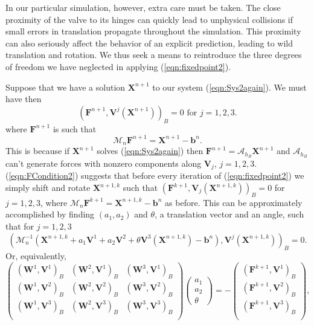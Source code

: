 \documentclass[preprint,12pt]{elsarticle}
\begin{document}
In our particular simulation, however, extra care must be taken. The close proximity of the valve to its hinges can quickly lead to unphysical collisions 
if small errors in translation propagate throughout the simulation. 
This proximity can also seriously affect the behavior of an explicit prediction, leading to wild translation and rotation. We thus seek a means to reintroduce the three degrees of freedom we have neglected in applying (\ref{eqn:fixedpoint2}).

Suppose that we have a solution $\mathbf{X}^{n+1}$ to our system (\ref{eqn:Sys2again}). We must have then
\begin{equation}
( \mathbf{F}^{n+1}, \mathbf{V}^j(\mathbf{X}^{n+1}) )_B = 0
\textrm{ for } j=1,2,3.
\label{eqn:FCondition2}
\end{equation}
where $\mathbf{F}^{n+1}$ is such that 
\begin{equation}
\mathcal{M}_n\mathbf{F}^{n+1}=\mathbf{X}^{n+1}-\mathbf{b}^n.
\end{equation}
This is because if $\mathbf{X}^{n+1}$ solves (\ref{eqn:Sys2again}) then $\mathbf{F}^{n+1} = \mathcal{A}_{h_B}\mathbf{X}^{n+1}$ and $\mathcal{A}_{h_B}$ can't generate forces with nonzero components along $\mathbf{V}_j$, $j=1,2,3$.
(\ref{eqn:FCondition2}) suggests that before every iteration of (\ref{eqn:fixedpoint2}) we simply shift and rotate $\mathbf{X}^{n+1,k}$ such that 
$( \mathbf{F}^{k+1}, \mathbf{V}_j(\mathbf{X}^{n+1,k}) )_B = 0$ for $j=1,2,3$, where $\mathcal{M}_n\mathbf{F}^{k+1}=\mathbf{X}^{n+1,k}-\mathbf{b}^n$ as before. This can be approximately accomplished by finding $(a_1,a_2)$ and $\theta$, a translation vector and an angle, such that for $j=1,2,3$
\begin{equation}
( \mathcal{M}_n^{-1}(\mathbf{X}^{n+1,k}+a_1\mathbf{V}^1+a_2\mathbf{V}^2+\theta\mathbf{V}^3(\mathbf{X}^{n+1,k})-\mathbf{b}^n),  \mathbf{V}^j(\mathbf{X}^{n+1,k}) )_B = 0.
\label{eqn:ProjFree}
\end{equation}
Or, equivalently,
\begin{equation}
\left( \begin{array}{ccc}
(\mathbf{W}^1,\mathbf{V}^1)_B &
(\mathbf{W}^2,\mathbf{V}^1)_B &
(\mathbf{W}^3,\mathbf{V}^1)_B \\
(\mathbf{W}^1,\mathbf{V}^2)_B &
(\mathbf{W}^2,\mathbf{V}^2)_B &
(\mathbf{W}^3,\mathbf{V}^2)_B \\
(\mathbf{W}^1,\mathbf{V}^3)_B &
(\mathbf{W}^2,\mathbf{V}^3)_B &
(\mathbf{W}^3,\mathbf{V}^3)_B \\
\end{array} \right)
\left( \begin{array}{c}
a_1 \\ a_2 \\ \theta
\end{array} \right)
=
-\left( \begin{array}{c}
(\mathbf{F}^{k+1},\mathbf{V}^1)_B \\
(\mathbf{F}^{k+1},\mathbf{V}^2)_B \\
(\mathbf{F}^{k+1},\mathbf{V}^3)_B \\
\end{array} \right),
\end{equation}
\end{document}
